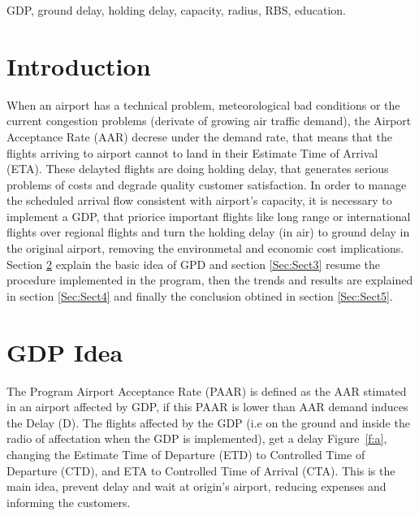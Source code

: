 \documentclass[final,1p]{elsarticle}
\begin{document}
\begin{frontmatter}
\begin{abstract}
\end{abstract}

\begin{keyword}
GDP, ground delay, holding delay, capacity, radius, RBS, education.

\end{keyword}

\end{frontmatter}

\section{Introduction}
\label{Sec:Sect1}

When an airport has a technical problem, meteorological bad conditions or the current congestion problems (derivate of growing air traffic demand), the Airport Acceptance Rate (AAR) decrese under the demand rate, that means that the flights arriving to airport cannot to land in their Estimate Time of Arrival (ETA). These delayted flights are doing holding delay, that generates serious problems of costs and degrade quality customer satisfaction. In order to manage the scheduled arrival flow consistent with airport's capacity, it is necessary to implement a GDP, that priorice important flights like long range or international flights over regional flights and turn the holding delay (in air) to ground delay in the original airport, removing the environmetal and economic cost implications. Section \ref{Sec:Sect2} explain the basic idea of GPD and section \ref{Sec:Sect3} resume the procedure implemented in the program, then the trends and results are explained in section \ref{Sec:Sect4} and finally the conclusion obtined in section \ref{Sec:Sect5}.


\section{GDP Idea}
\label{Sec:Sect2}

 
The Program Airport Acceptance Rate (PAAR) is defined as the AAR stimated in an airport affected by GDP, if this PAAR is lower than AAR demand induces the Delay (D). The flights affected by the GDP (i.e on the ground and inside the radio of affectation when the GDP is implemented), get a delay Figure~\ref{f:a}, changing the Estimate Time of Departure (ETD) to Controlled Time of Departure (CTD), and ETA to Controlled Time of Arrival (CTA). This is the main idea, prevent delay and wait at origin's airport, reducing expenses and informing the customers.
\end{document}
